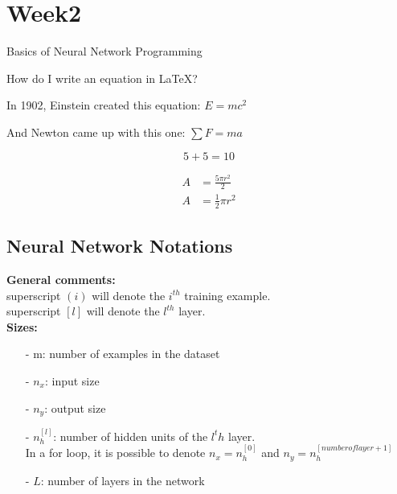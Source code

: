 \documentclass{article}
\begin{document}
\newpage
\section{Week2}

    Basics of Neural Network Programming

    How do I write an equation in \LaTeX?\\

    \begin{center}
    \end{center}

    In 1902, Einstein created this equation: $E=mc^2$

    And Newton came up with this one: $\sum F=ma$

    \begin{equation}
        5+5=10
    \end{equation}

    \begin{equation}
        \begin{split}
            A & = \frac{5\pi r^2}{2} \\
            A & = \frac{1}{2} \pi r^2
        \end{split}
    \end{equation}

\newpage
\subsection{Neural Network Notations}

    \textbf{General comments:}\\
    superscript $(i)$ will denote the $i^{th}$ training example. \\
    superscript $[l]$ will denote the $l^{th}$ layer.\\

    \textbf{Sizes:}
    \begin{itemize}
        \item[-]{m: number of examples in the dataset}
        \item[-]{$n_x$: input size}
        \item[-]{$n_y$: output size}
        \item[-]{$n_h^{[l]}$: number of hidden units of the ${l^th}$ layer. \\ In a for loop, it is possible to denote $n_x = n_h^{[0]}$ and $n_y = n_h^{[number of layer+1]}$ }
        \item[-]{$L$: number of layers in the network}
    \end{itemize}
\end{document}
